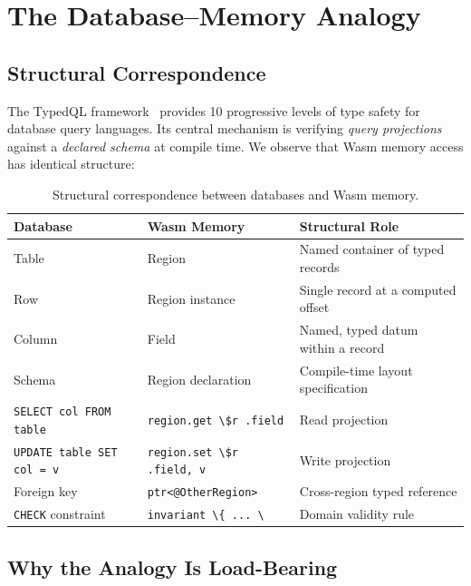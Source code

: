 \documentclass[11pt,a4paper]{article}
\begin{document}
\section{The Database--Memory Analogy}
\label{sec:analogy}

\subsection{Structural Correspondence}
\label{sec:correspondence}

The TypedQL framework~\cite{jewell2026} provides 10 progressive levels
of type safety for database query languages.  Its central mechanism is
verifying \emph{query projections} against a \emph{declared schema} at
compile time.  We observe that Wasm memory access has identical
structure:

\begin{table}[htbp]
\centering
\caption{Structural correspondence between databases and Wasm memory.}
\label{tab:correspondence}
\begin{tabularx}{\textwidth}{@{}lll@{}}
\toprule
\textbf{Database} & \textbf{Wasm Memory} & \textbf{Structural Role} \\
\midrule
Table & Region & Named container of typed records \\
Row & Region instance & Single record at a computed offset \\
Column & Field & Named, typed datum within a record \\
Schema & Region declaration & Compile-time layout specification \\
\lstinline{SELECT col FROM table} & \lstinline{region.get \$r .field} & Read projection \\
\lstinline{UPDATE table SET col = v} & \lstinline{region.set \$r .field, v} & Write projection \\
Foreign key & \lstinline{ptr<@OtherRegion>} & Cross-region typed reference \\
\lstinline{CHECK} constraint & \lstinline{invariant \{ ... \}} & Domain validity rule \\
\bottomrule
\end{tabularx}
\end{table}

\subsection{Why the Analogy Is Load-Bearing}
\label{sec:loadbearing}
\end{document}
